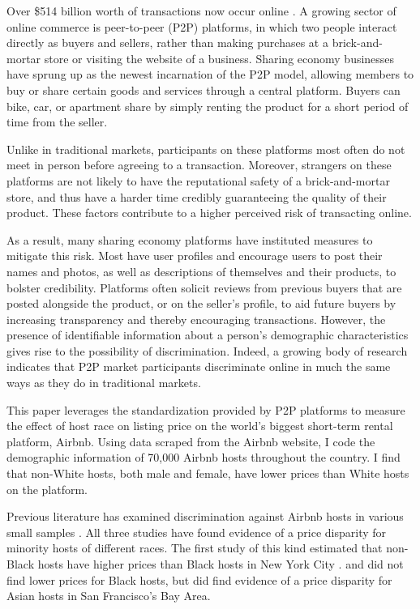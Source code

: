 

Over \$514 billion worth of transactions now occur online \citep {ecommerce}. A growing sector of online commerce is peer-to-peer (P2P) platforms, in which two people interact directly as buyers and sellers, rather than making purchases at a brick-and-mortar store or visiting the website of a business. Sharing economy businesses have sprung up as the newest incarnation of the P2P model, allowing members to buy or share certain goods and services through a central platform. Buyers can bike, car, or apartment share by simply renting the product for a short period of time from the seller. 

Unlike in traditional markets, participants on these platforms most often do not meet in person before agreeing to a transaction. Moreover, strangers on these platforms are not likely to have the reputational safety of a brick-and-mortar store, and thus have a harder time credibly guaranteeing the quality of their product. These factors contribute to a higher perceived risk of transacting online. 

As a result, many sharing economy platforms have instituted measures to mitigate this risk. Most have user profiles and encourage users to post their names and photos, as well as descriptions of themselves and their products, to bolster credibility. Platforms often solicit reviews from previous buyers that are posted alongside the product, or on the seller's profile, to aid future buyers by increasing transparency and thereby encouraging transactions. However, the presence of identifiable information about a person’s demographic characteristics gives rise to the possibility of discrimination. Indeed, a growing body of research indicates that P2P market participants discriminate online in much the same ways as they do in traditional markets. 

This paper leverages the standardization provided by P2P platforms to measure the effect of host race on listing price on the world's biggest short-term rental platform, Airbnb. Using data scraped from the Airbnb website, I code the demographic information of 70,000 Airbnb hosts throughout the country. I find that non-White hosts, both male and female, have lower prices than White hosts on the platform. %

Previous literature has examined discrimination against Airbnb hosts in various small samples \citep{edelman, wang, kakar}. All three studies have found evidence of a price disparity for minority hosts of different races. The first study of this kind estimated that non-Black hosts have higher prices than Black hosts in New York City \citep{edelman}. \cite{wang} and \cite{kakar} did not find lower prices for Black hosts, but did find evidence of a price disparity for Asian hosts in San Francisco's Bay Area. 

